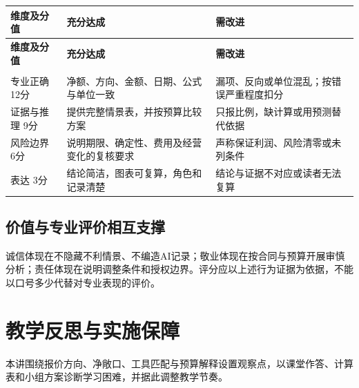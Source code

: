 \documentclass[lang=cn,11pt,oneside,openany,chinesefont=nofont,color=blue,titlestyle=hang]{elegantbook}
\begin{document}
\begingroup\small{}\setlength{\tabcolsep}{6pt}\renewcommand{\arraystretch}{1.24}
\begin{longtable}{>{\raggedright\arraybackslash}p{}>{\raggedright\arraybackslash}p{}>{\raggedright\arraybackslash}p{}}
\toprule[.8pt]\rowcolor{Navy}
\color{white}\bfseries 维度及分值 & \color{white}\bfseries 充分达成 & \color{white}\bfseries 需改进 \\
\midrule\endfirsthead
\toprule[.8pt]\rowcolor{Navy}
\color{white}\bfseries 维度及分值 & \color{white}\bfseries 充分达成 & \color{white}\bfseries 需改进 \\
\midrule\endhead
\midrule\multicolumn{3}{r}{\footnotesize\color{Muted}续下页}\\\endfoot
\bottomrule[.8pt]\endlastfoot
专业正确 12分 & 净额、方向、金额、日期、公式与单位一致 & 漏项、反向或单位混乱；按错误严重程度扣分 \\
\midrule[.25pt]
\rowcolor{Pale}
证据与推理 9分 & 提供完整情景表，并按预算比较方案 & 只报比例，缺计算或用预测替代依据 \\
\midrule[.25pt]
风险边界 6分 & 说明期限、确定性、费用及经营变化的复核要求 & 声称保证利润、风险清零或未列条件 \\
\midrule[.25pt]
\rowcolor{Pale}
表达 3分 & 结论简洁，图表可复算，角色和记录清楚 & 结论与证据不对应或读者无法复算 \\
\midrule[.25pt]
\end{longtable}\endgroup

\subsection*{价值与专业评价相互支撑}

诚信体现在不隐藏不利情景、不编造AI记录；敬业体现在按合同与预算开展审慎分析；责任体现在说明调整条件和授权边界。评分应以上述行为证据为依据，不能以口号多少代替对专业表现的评价。

\clearpage

\section{教学反思与实施保障}\label{sec:g11}

本讲围绕报价方向、净敞口、工具匹配与预算解释设置观察点，以课堂作答、计算表和小组方案诊断学习困难，并据此调整教学节奏。
\end{document}

